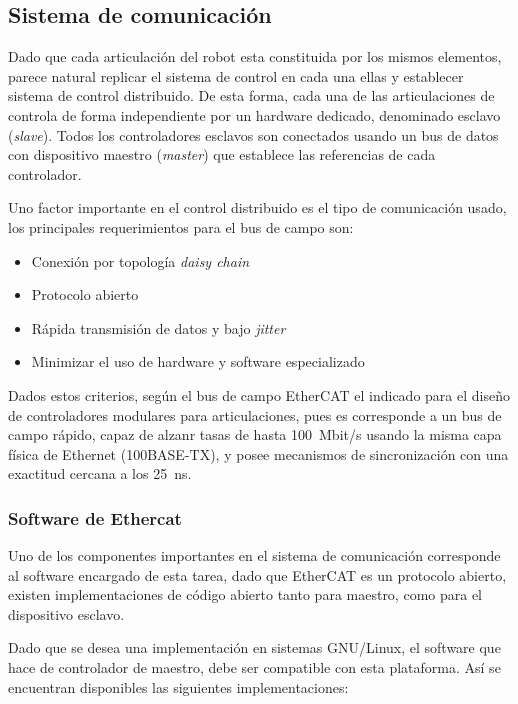 \subsection{Sistema de comunicación}

Dado que cada articulación del robot esta constituida por los mismos elementos, parece natural replicar el sistema de control en cada una ellas y establecer sistema de control distribuido. De esta forma, cada una de las articulaciones de controla de forma independiente por un hardware dedicado, denominado esclavo (\textit{slave}). Todos los controladores esclavos son conectados usando un bus de datos con dispositivo maestro (\textit{master}) que establece las referencias de cada controlador.

Uno factor importante en el control distribuido es el tipo de comunicación usado, los principales requerimientos para el bus de campo son:
\begin{itemize}
\item Conexión por topología \textit{daisy chain}
\item Protocolo abierto
\item Rápida transmisión de datos y bajo \textit{jitter} 
\item Minimizar el uso de hardware y software especializado
\end{itemize}

Dados estos criterios, según \cite{liu2015} el bus de campo EtherCAT el indicado para el diseño de controladores modulares para articulaciones, pues es corresponde a un bus de campo rápido, capaz de alzanr tasas de hasta \SI{100}{Mbit/s} usando la misma capa física de Ethernet (100BASE-TX), y posee mecanismos de sincronización con una exactitud cercana a los \SI{25}{\nano\second}.

\subsubsection{Software de Ethercat}

Uno de los componentes importantes en el sistema de comunicación corresponde al software encargado de esta tarea, dado que EtherCAT es un protocolo abierto, existen implementaciones de código abierto tanto para maestro, como para el dispositivo esclavo.

Dado que se desea una implementación en sistemas GNU/Linux, el software que hace de controlador de maestro, debe ser compatible con esta plataforma. Así se encuentran disponibles las siguientes implementaciones:

